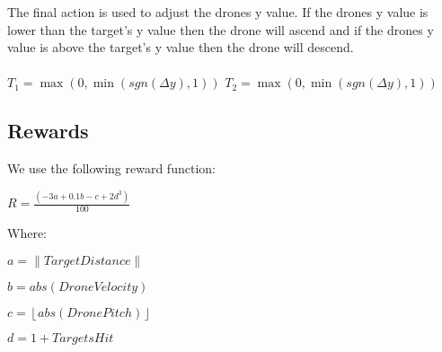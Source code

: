 \endgroup

The final action is used to adjust the drones y value. If the drones y value is lower than the target's y value then the drone will ascend and if the drones y value is above the target's y value then the drone will descend. 
\\
\begingroup\centering
\\
$T_1 =  \max (0,\min (sgn(\Delta y),1))$
$T_2 =  \max (0,\min (sgn(\Delta y),1))$

\endgroup

\subsection{Rewards}
We use the following reward function:

\begingroup\centering

$R=\frac{(-3a+0.1b-c+2d^3)}{100}$

\endgroup

Where:

\begingroup\centering
$a=\left \| Target Distance \right \|$

$b=abs(Drone Velocity)$

$c= \left \lfloor abs(DronePitch)  \right \rfloor $

$d=1+TargetsHit$

\endgroup
